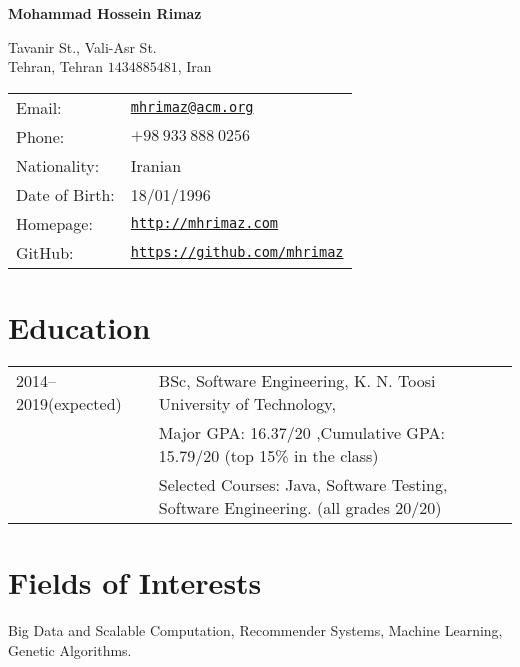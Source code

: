 \documentclass[letterpaper]{article}
\def\name{Mohammad Hossein Rimaz}
\renewenvironment{itemize}{
  \begin{list}{}{
    \setlength{\leftmargin}{1.5em}
  }
}{
  \end{list}
}
\begin{document}
{\huge \bf \name}


\vspace{0.25in}

\begin{minipage}{0.45\linewidth}
  Tavanir St., Vali-Asr St. \\
  Tehran, Tehran $1434885481$, Iran
\end{minipage}
\begin{minipage}{0.45\linewidth}
  \begin{tabular}{ll}
    Email: & \href{mailto:mhrimaz@acm.org}{\tt mhrimaz@acm.org} \\
    Phone: & $+98~933~888~0256$ \\
    Nationality: & Iranian \\
    Date of Birth: & 18/01/1996  \\
    Homepage: & \href{http://mhrimaz.com}{\tt http://mhrimaz.com} \\
    GitHub: & \href{https://mhrimaz.github.io}{\tt https://github.com/mhrimaz} 
  \end{tabular}
\end{minipage}


\section*{Education}

{\renewcommand{\arraystretch}{1.2}
\begin{tabular}{l l}
2014--2019(expected) & BSc, Software Engineering, K. N. Toosi University of Technology,\\
 & Major GPA: 16.37/20 ,Cumulative GPA: 15.79/20 (top 15\% in the class) \\
 & Selected Courses: Java, Software Testing, Software Engineering. (all grades 20/20)
\end{tabular}
}

\section*{Fields of Interests}

\begin{itemize}
	\item Big Data and Scalable Computation, Recommender Systems, Machine Learning, Genetic Algorithms.
\end{itemize}
\end{document}
